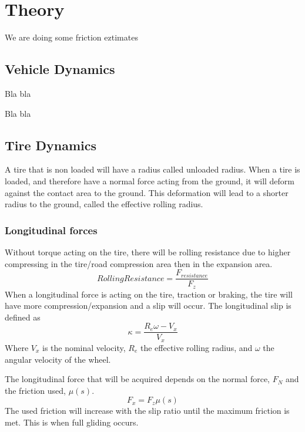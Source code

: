 \chapter{Theory}


We are doing some friction eztimates

\section{Vehicle Dynamics}

Bla bla \cite{fordonsdynamik}

Bla bla \cite{pacejka}

\section{Tire Dynamics}

A tire that is non loaded will have a radius called unloaded radius. When a tire is loaded, and therefore have a normal force acting from the ground, it will deform against the contact area to the ground. This deformation will lead to a shorter radius to the ground, called the effective rolling radius. 

\subsection{Longitudinal forces}

Without torque acting on the tire, there will be rolling resistance due to higher compressing in the tire/road compression area then in the expansion area.
\begin{equation}
 	RollingResistance = \frac{F_{resistance}}{F_{z}}
\end{equation}
When a longitudinal force is acting on the tire, traction or braking, the tire will have more compression/expansion and a slip will occur. The longitudinal slip is defined as
\begin{equation}
	 \kappa = \dfrac{R_{e}\omega-V_{x}}{V_{x}}
\end{equation}
Where $V_{x}$ is the nominal velocity, $R_{e}$ the effective rolling radius, and $\omega$ the angular velocity of the wheel.

The longitudinal force that will be acquired depends on the normal force, $ F_{N} $ and the friction used, $ \mu(s) $.
\begin{equation}
	 F_{x} = F_{z}\mu(s)
\end{equation}
The used friction will increase with the slip ratio until the maximum friction is met. This is when full gliding occurs. 

